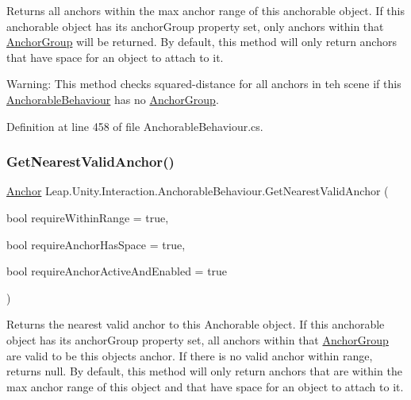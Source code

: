Returns all anchors within the max anchor range of this anchorable object. If this anchorable object has its anchor\+Group property set, only anchors within that \mbox{\hyperlink{class_leap_1_1_unity_1_1_interaction_1_1_anchor_group}{Anchor\+Group}} will be returned. By default, this method will only return anchors that have space for an object to attach to it. 

Warning\+: This method checks squared-\/distance for all anchors in teh scene if this \mbox{\hyperlink{class_leap_1_1_unity_1_1_interaction_1_1_anchorable_behaviour}{Anchorable\+Behaviour}} has no \mbox{\hyperlink{class_leap_1_1_unity_1_1_interaction_1_1_anchor_group}{Anchor\+Group}}. 

Definition at line 458 of file Anchorable\+Behaviour.\+cs.

\mbox{\label{class_leap_1_1_unity_1_1_interaction_1_1_anchorable_behaviour_a34daac6bf30d498a6df3c847124dd219}} 
\subsubsection{\texorpdfstring{GetNearestValidAnchor()}{GetNearestValidAnchor()}}
{\footnotesize\ttfamily \mbox{\hyperlink{class_leap_1_1_unity_1_1_interaction_1_1_anchor}{Anchor}} Leap.\+Unity.\+Interaction.\+Anchorable\+Behaviour.\+Get\+Nearest\+Valid\+Anchor (\begin{DoxyParamCaption}\item[{bool}]{require\+Within\+Range = {\ttfamily true},  }\item[{bool}]{require\+Anchor\+Has\+Space = {\ttfamily true},  }\item[{bool}]{require\+Anchor\+Active\+And\+Enabled = {\ttfamily true} }\end{DoxyParamCaption})}



Returns the nearest valid anchor to this Anchorable object. If this anchorable object has its anchor\+Group property set, all anchors within that \mbox{\hyperlink{class_leap_1_1_unity_1_1_interaction_1_1_anchor_group}{Anchor\+Group}} are valid to be this object\textquotesingle{}s anchor. If there is no valid anchor within range, returns null. By default, this method will only return anchors that are within the max anchor range of this object and that have space for an object to attach to it. 


